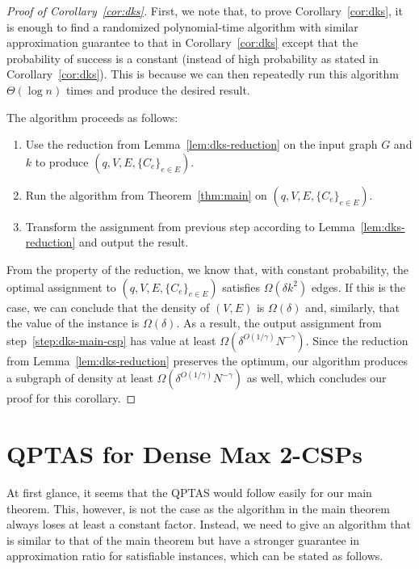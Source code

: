 \documentclass{article}
\begin{document}
\begin{proof}[Proof of Corollary~\ref{cor:dks}]
  First, we note that, to prove Corollary~\ref{cor:dks}, it is enough to find a randomized polynomial-time algorithm with similar approximation guarantee to that in Corollary~\ref{cor:dks} except that the probability of success is a constant (instead of high probability as stated in Corollary~\ref{cor:dks}). This is because we can then repeatedly run this algorithm $\Theta(\log n)$ times and produce the desired result.

  The algorithm proceeds as follows:
  \begin{enumerate}
    \item Use the reduction from Lemma~\ref{lem:dks-reduction} on the input graph $G$ and $k$ to produce $(q, V, E, \{C_e\}_{e \in E})$.
    \item Run the algorithm from Theorem~\ref{thm:main} on $(q, V, E, \{C_e\}_{e \in E})$. \label{step:dks-main-csp}
    \item Transform the assignment from previous step according to Lemma~\ref{lem:dks-reduction} and output the result.
  \end{enumerate}

  From the property of the reduction, we know that, with constant probability, the optimal assignment to $(q, V, E, \{C_e\}_{e \in E})$ satisfies $\Omega(\delta k^2)$ edges. If this is the case, we can conclude that the density of $(V, E)$ is $\Omega(\delta)$ and, similarly, that the value of the instance is $\Omega(\delta)$. As a result, the output assignment from step~\ref{step:dks-main-csp} has value at least $\Omega(\delta^{O(1/\gamma)}N^{-\gamma})$. Since the reduction from Lemma~\ref{lem:dks-reduction} preserves the optimum, our algorithm produces a subgraph of density at least $\Omega(\delta^{O(1/\gamma)}N^{-\gamma})$ as well, which concludes our proof for this corollary.
\end{proof}

\section{QPTAS for Dense Max 2-CSPs}

At first glance, it seems that the QPTAS would follow easily for our main theorem. This, however, is not the case as the algorithm in the main theorem always loses at least a constant factor. Instead, we need to give an algorithm that is similar to that of the main theorem but have a stronger guarantee in approximation ratio for satisfiable instances, which can be stated as follows. \\
\end{document}
